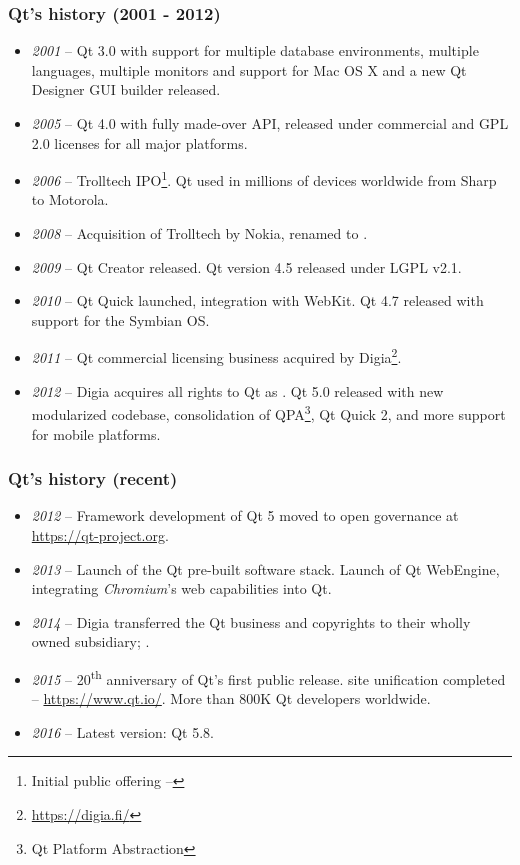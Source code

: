 \begin{frame}
  \frametitle{Qt's history (2001 - 2012)}
  \scriptsize
  \begin{itemize}
    \item {\em 2001} -- Qt 3.0 with support for multiple database environments,
      multiple languages, multiple monitors and support for Mac OS X and a new
      Qt Designer GUI builder released.
    \item {\em 2005} -- Qt 4.0 with fully made-over API, released
      under commercial and GPL 2.0 licenses for all major platforms.
    \item {\em 2006} -- Trolltech IPO\footnote{\tiny Initial public offering --
      }. 
      Qt used in millions of devices worldwide from Sharp to Motorola.
    \item {\em 2008} -- Acquisition of Trolltech by  Nokia, renamed to
      .
    \item {\em 2009} -- Qt Creator released. Qt version 4.5 released under LGPL v2.1.
    \item {\em 2010} -- Qt Quick launched, integration with WebKit. Qt 4.7 released
      with support for the Symbian OS.
    \item {\em 2011} -- Qt commercial licensing business acquired by
      Digia\footnote{\tiny\url{https://digia.fi/}}.
    \item {\em 2012} -- Digia acquires all rights to Qt as .
      Qt 5.0 released with new modularized codebase, consolidation of QPA\footnote
      {\tiny Qt Platform Abstraction}, Qt Quick 2, and more support for mobile
      platforms.
  \end{itemize}
\end{frame}

\begin{frame}
  \frametitle{Qt's history (recent)}
  \scriptsize
  \begin{itemize}
    \item {\em 2012} -- Framework development of Qt 5 moved to open governance
      at \url{https://qt-project.org}.
    \item {\em 2013} -- Launch of the Qt pre-built software stack. Launch of
      Qt WebEngine, integrating {\em Chromium}'s web capabilities into Qt.
    \item {\em 2014} -- Digia transferred the Qt business and copyrights to their
      wholly owned subsidiary; .
    \item {\em 2015} -- 20\textsuperscript{th} anniversary of Qt's first
      public release.
       site unification completed -- \url{https://www.qt.io/}.
      More than 800K Qt developers worldwide.
    \item {\em 2016} -- Latest version: Qt 5.8.
  \end{itemize}
\end{frame}

